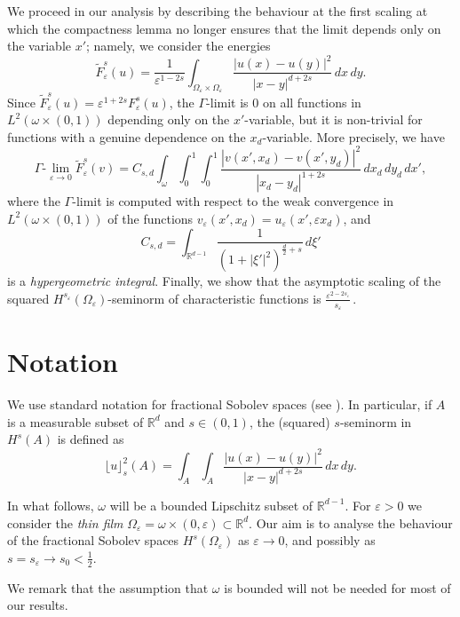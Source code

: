 \documentclass[11pt]{article}
\def\e{\varepsilon}
\begin{document}
We proceed in our analysis by describing the behaviour at the first scaling at which the compactness lemma no longer ensures that the limit depends only on the variable $x'$; namely, we consider the energies 
\[
\widetilde F^s_\e(u)= \frac1{\e^{1-2s}}
\int_{\Omega_\e\times\Omega_\e}
\frac{|u(x)-u(y)|^2}{|x-y|^{d+2s}}\,dx\,dy.
\]
Since $\widetilde F^s_\e(u)= \e^{1+2s} F^s_\e(u)$, the $\Gamma$-limit is $0$ on all functions in $L^2(\omega\times (0,1))$ depending only on the $x'$-variable, but it is non-trivial for functions with a genuine dependence on the $x_d$-variable. More precisely, we have
\[
\Gamma\text{-}\lim_{\e\to 0} \widetilde F^{s}_\e(v)= C_{s,d}\int_{\omega}\int_0^1\int_0^1\frac{|v(x', x_d)-v(x', y_d)|^2}{|x_d-y_d|^{1+2s}}\, dx_d\, dy_d\, dx',
\]
where the $\Gamma$-limit is computed with respect to the weak convergence in $L^2(\omega\times(0,1))$ of the functions $v_\e(x',x_d)=u_\e(x',\e x_d)$, and
\[
C_{s,d}=\int_{\mathbb R^{d-1}}
\frac{1}{(1+|\xi'|^2)^{\frac{d}{2}+s}}\, d\xi' 
\]
is a {\em hypergeometric integral}. Finally, we show that the asymptotic scaling of the squared $H^{s_\e}(\Omega_\e)$-seminorm of characteristic functions is
$
\frac{\e^{2-2s_\e}}{s_\e}\,.
$

\section{Notation}
We use standard notation for fractional Sobolev spaces (see \cite{leofrac}). In particular, if $A$ is a measurable subset of $\mathbb R^d$ and $s\in(0,1)$, the (squared) $s$-seminorm in $H^s(A)$ is defined as  
\[
\lfloor u\rfloor_s^2(A)=\int_{A}\int_{A} \frac{|u(x)-u(y)|^2}{|x-y|^{d+2s}}\, dx\, dy.
\]

In what follows, $\omega$ will be a bounded Lipschitz subset of $\mathbb R^{d-1}$. For $\varepsilon>0$ we consider the {\em thin film} $\Omega_\varepsilon=\omega\times(0,\varepsilon)\subset\mathbb R^d$. Our aim is to analyse the behaviour of the fractional Sobolev spaces $H^s(\Omega_\varepsilon)$ as $\varepsilon\to 0$, and possibly as $s=s_\varepsilon\to s_0<\frac12$.

We remark that the assumption that $\omega$ is bounded will not be needed for most of our results.


\end{document}
